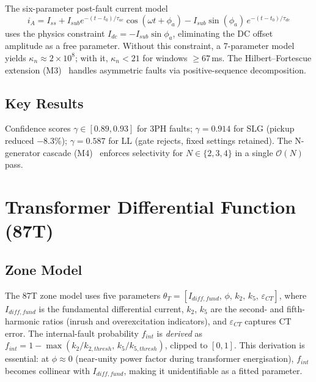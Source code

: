 \documentclass[journal,twoside,10pt]{IEEEtran}
\begin{document}
The six-parameter post-fault current model
\begin{equation}
  i_A = I_{ss} + I_{sub}e^{-(t-t_0)/\tau_{ac}}\cos(\omega t+\phi_a)
        - I_{sub}\sin(\phi_a)\,e^{-(t-t_0)/\tau_{dc}}
  \label{eq:syncoc_model}
\end{equation}
uses the physics constraint $I_{dc} = -I_{sub}\sin\phi_a$, eliminating
the DC offset amplitude as a free parameter.
Without this constraint, a 7-parameter model yields $\kappa_n \approx
2\times10^8$; with it, $\kappa_n < 21$ for windows $\geq 67$\,ms.
The Hilbert--Fortescue extension (M3)~\cite{EluvathingalPaperB} handles
asymmetric faults via positive-sequence decomposition.

\subsection{Key Results}

Confidence scores $\gamma \in [0.89, 0.93]$ for 3PH faults;
$\gamma = 0.914$ for SLG (pickup reduced $-8.3\%$);
$\gamma = 0.587$ for LL (gate rejects, fixed settings retained).
The N-generator cascade (M4)~\cite{EluvathingalPaperB} enforces
selectivity for $N \in \{2,3,4\}$ in a single $\mathcal{O}(N)$ pass.

\section{Transformer Differential Function (87T)}
\label{sec:t87}

\subsection{Zone Model}
\label{sec:t87:model}

The 87T zone model uses five parameters
$\theta_T = [I_{diff,fund},\,\phi,\,k_2,\,k_5,\,\varepsilon_{CT}]$,
where $I_{diff,fund}$ is the fundamental differential current,
$k_2$, $k_5$ are the second- and fifth-harmonic ratios (inrush and
overexcitation indicators), and $\varepsilon_{CT}$ captures CT error.
The internal-fault probability $f_{int}$ is \emph{derived} as
$f_{int} = 1 - \max(k_2/k_{2,thresh},\,k_5/k_{5,thresh})$,
clipped to $[0,1]$.
This derivation is essential: at $\phi \approx 0$ (near-unity power factor
during transformer energisation), $f_{int}$ becomes collinear with
$I_{diff,fund}$, making it unidentifiable as a fitted parameter.
\end{document}
